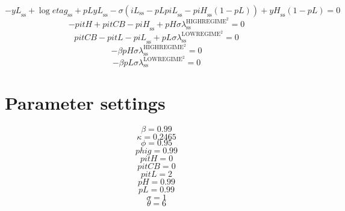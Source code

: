 \begin{equation}
-{y\!L}_\mathrm{ss} + \log{{e\!t\!a\!g}_\mathrm{ss}} + {{p\!L}} {{y\!L}_\mathrm{ss}} - {\sigma} \left({i\!L}_\mathrm{ss} - {{p\!L}} {{p\!i\!L}_\mathrm{ss}} - {{p\!i\!H}_\mathrm{ss}} \left(1 - {p\!L}\right)\right) + {{y\!H}_\mathrm{ss}} \left(1 - {p\!L}\right) = 0
\end{equation}
\begin{equation}
-{p\!i\!t\!H} + {p\!i\!t\!C\!B} - {p\!i\!H}_\mathrm{ss} + {{p\!H}} {\sigma} {\lambda^{\mathrm{HIGHREGIME}^{\mathrm{2}}}_\mathrm{ss}} = 0
\end{equation}
\begin{equation}
{p\!i\!t\!C\!B} - {p\!i\!t\!L} - {p\!i\!L}_\mathrm{ss} + {{p\!L}} {\sigma} {\lambda^{\mathrm{LOWREGIME}^{\mathrm{2}}}_\mathrm{ss}} = 0
\end{equation}
\begin{equation}
-{\beta} {{p\!H}} {\sigma} {\lambda^{\mathrm{HIGHREGIME}^{\mathrm{2}}}_\mathrm{ss}} = 0
\end{equation}
\begin{equation}
-{\beta} {{p\!L}} {\sigma} {\lambda^{\mathrm{LOWREGIME}^{\mathrm{2}}}_\mathrm{ss}} = 0
\end{equation}






\section{Parameter settings}

\begin{equation}
\beta = 0.99
\end{equation}
\begin{equation}
\kappa = 0.2465
\end{equation}
\begin{equation}
\phi = 0.95
\end{equation}
\begin{equation}
{p\!h\!i\!g} = 0.99
\end{equation}
\begin{equation}
{p\!i\!t\!H} = 0
\end{equation}
\begin{equation}
{p\!i\!t\!C\!B} = 0
\end{equation}
\begin{equation}
{p\!i\!t\!L} = 2
\end{equation}
\begin{equation}
{p\!H} = 0.99
\end{equation}
\begin{equation}
{p\!L} = 0.99
\end{equation}
\begin{equation}
\sigma = 1
\end{equation}
\begin{equation}
\theta = 6
\end{equation}


